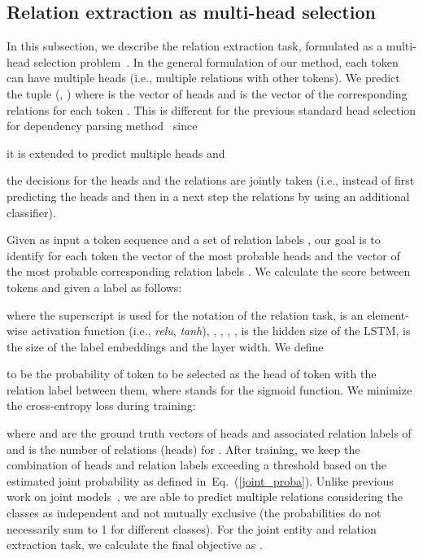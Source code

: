 \documentclass[review]{elsarticle}
\newcommand{\ie}{i.e., }
\newcommand{\equref}[1]{Eq.~(\ref{#1})}
\begin{document}
\subsection{Relation extraction as multi-head selection}
\label{subsec:head_selection}

\noindent In this subsection, we describe the relation extraction task, formulated as a multi-head selection problem~\citep{zhang:16,bekoulis:18}. In the general formulation of our method, each token  can have multiple heads (\ie multiple relations with other tokens).
We predict the tuple (, ) where  is the vector of heads and  is the vector of the corresponding relations for each token . This is different for the previous standard head selection for dependency parsing method~\citep{zhang:16} since 
\begin{enumerate*}[label=(\roman*)]
\item it is extended to predict multiple heads and
\item the decisions for the heads and the relations are jointly taken (\ie instead of first predicting the heads and then in a next step the relations by using an additional classifier).
\end{enumerate*}
Given as input a token sequence  and a set of relation labels , our goal is to identify for
each token  
the vector of the most probable heads   
and the vector of the most probable corresponding relation labels . 
We calculate the score between tokens  and  given a label  as follows:

where the superscript  is used for the notation of the relation task,  is an element-wise activation function (\ie \emph{relu}, \emph{tanh}), , , , ,  is the hidden size of the LSTM,  is the size of the label embeddings and  the layer width.
We define

to be the probability of token  to be selected as the head of token  with the relation label  between them, where  stands for the sigmoid function.
We minimize the cross-entropy loss  during training:

where  and  are the ground truth vectors of heads and associated relation labels of  and  is the number of relations (heads) for . After training, we keep the combination of heads  and relation labels  exceeding a threshold based on the estimated joint probability as defined in~\equref{joint_proba}. Unlike previous work on joint models~\citep{katiyar:17}, we are able to predict multiple relations considering the classes as independent and not mutually exclusive (the probabilities do not necessarily sum to 1 for different classes). For the joint entity and relation extraction task, we calculate the final objective as . 
\end{document}
